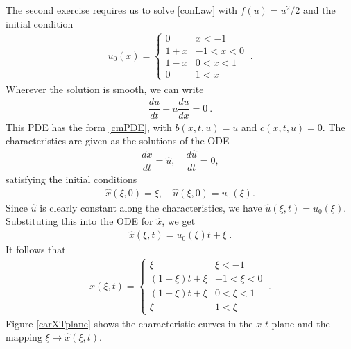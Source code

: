 \documentclass[10pt,letterpaper]{article}
\newcommand{\rb}[1]{ \left(  {#1} \right) }
\newcommand{\frb}[1]{ \left(  {#1} \right) }
\theoremstyle{break}
\begin{document}
\begin{solution}
	The second exercise requires us to solve \eqref{conLaw} with $f(u)=u^2/2$ and the initial condition
	\begin{gather}
		u_0(x)=\begin{cases}
				0 	& 	  x<-1\\
				1+x  	& -1 < x<0\\
				1-x 	&  0 < x<1\\
				0 	&  1 < x
			\end{cases}\ .
	\end{gather}
	Wherever the solution is smooth, we can write
	\begin{gather}
		\dfrac{du}{dt}+u\dfrac{du}{dx}=0\ .
	\end{gather}
	This PDE has the form \eqref{cmPDE}, with $b(x,t,u) = u$ and $c(x,t,u) = 0$.
	The characteristics are given as the solutions of the ODE
	\begin{gather}
		\dfrac{dx}{dt} =\hat u, 
		\quad
		\dfrac{d\hat u}{dt} = 0,
	\end{gather}
	satisfying the initial conditions
	\begin{gather}
		\hat x\frb{\xi,0} = \xi,
		\quad
		\hat u\frb{\xi,0} =u_0\frb{\xi}.
	\end{gather}
	Since $\hat u$ is clearly constant along the characteristics, we have $\hat u\frb{\xi,t}=u_0\frb{\xi}$.
	Substituting this into the ODE for $\hat x$, we get
	\begin{gather}
		\hat x\frb{\xi,t}=u_0\frb{\xi}t+\xi \ .
	\end{gather}
	It follows that
	\begin{gather}
		\hat x\frb{\xi,t}=\begin{cases}
				\xi 	& 	  \xi<-1\\
				\rb{1+\xi}t+\xi  	& -1 < \xi<0\\
				\rb{1-\xi}t+\xi 	&  0 < \xi<1\\
				\xi 	&  1 < \xi
			\end{cases}\ .
	\end{gather}
	Figure \ref{carXTplane} shows the characteristic curves in the $x$-$t$ plane and the mapping $\xi\mapsto \hat x\frb{\xi,t}$.
	

\end{solution}
\end{document}
